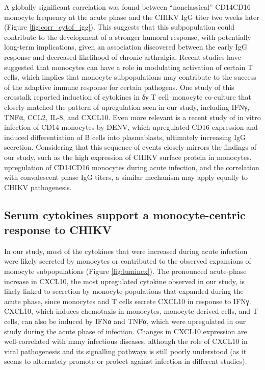 A globally significant correlation was found between “nonclassical” CD14\sups{+}\allowbreak CD16\sups{++} monocyte frequency at the acute phase and the CHIKV IgG titer two weeks later (Figure \ref{fig:corr_cytof_igg}). This suggests that this subpopulation could contribute to the development of a stronger humoral response, with potentially long-term implications, given an association discovered between the early IgG response and decreased likelihood of chronic arthralgia.\autocite{Kam2012} Recent studies have suggested that monocytes can have a role in modulating activation of certain T cells,\autocite{Charron2015,Eberl2009} which implies that monocyte subpopulations may contribute to the success of the adaptive immune response for certain pathogens. One study of this crosstalk reported induction of cytokines in δγ T cell–monocyte co-culture that closely matched the pattern of upregulation seen in our study, including IFNγ, TNFα, CCL2, IL-8, and CXCL10.\autocite{Eberl2009} Even more relevant is a recent study of in vitro infection of CD14\sups{+} monocytes by DENV, which upregulated CD16 expression and induced differentiation of B cells into plasmablasts, ultimately increasing IgG secretion.\autocite{Kwissa2014} Considering that this sequence of events closely mirrors the findings of our study, such as the high expression of CHIKV surface protein in monocytes, upregulation of CD14\sups{+}\allowbreak CD16\sups{+} monocytes during acute infection, and the correlation with convalescent phase IgG titers, a similar mechanism may apply equally to CHIKV pathogenesis.

\subsection{Serum cytokines support a monocyte-centric response to CHIKV}

In our study, most of the cytokines that were increased during acute infection were likely secreted by monocytes or contributed to the observed expansions of monocyte subpopulations (Figure \ref{fig:luminex}). The pronounced acute-phase increase in CXCL10, the most upregulated cytokine observed in our study, is likely linked to secretion by monocyte populations that expanded during the acute phase, since monocytes and T cells secrete CXCL10 in response to IFNγ.\autocite{Luster1987} CXCL10, which induces chemotaxis in monocytes, monocyte-derived cells, and T cells, can also be induced by IFNα and TNFα, which were upregulated in our study during the acute phase of infection.\autocite{Liu2011} Changes in CXCL10 expression are well-correlated with many infectious diseases,\autocite{Liu2011} although the role of CXCL10 in viral pathogenesis and its signalling pathways is still poorly understood (as it seems to alternately promote or protect against infection in different studies).	

